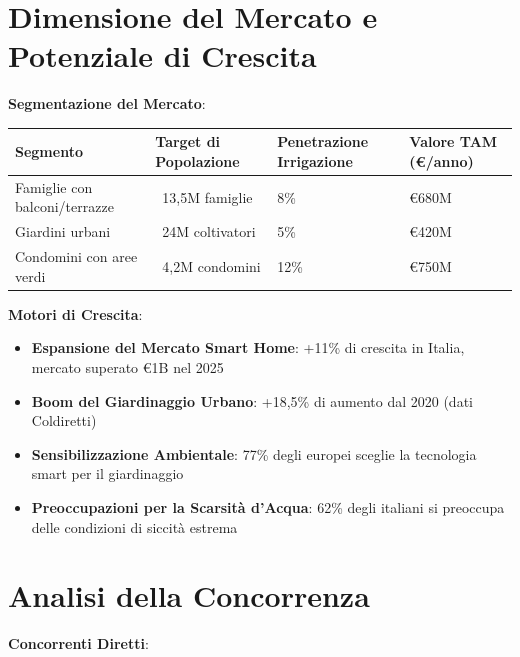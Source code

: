 \documentclass[11pt,a4paper]{report}
\begin{document}
\section{Dimensione del Mercato e Potenziale di Crescita}

\textbf{Segmentazione del Mercato}:

\begin{longtable}{|p{3cm}|p{3cm}|p{3cm}|p{2.5cm}|}
\hline
\textbf{Segmento} & \textbf{Target di Popolazione} & \textbf{Penetrazione Irrigazione} & \textbf{Valore TAM (€/anno)} \\ \hline
Famiglie con balconi/terrazze & ~13,5M famiglie & 8\% & €680M \\ \hline
Giardini urbani & ~24M coltivatori & 5\% & €420M \\ \hline
Condomini con aree verdi & ~4,2M condomini & 12\% & €750M \\ \hline
\end{longtable}

\textbf{Motori di Crescita}:
\begin{itemize}
    \item \textbf{Espansione del Mercato Smart Home}: +11\% di crescita in Italia, mercato superato €1B nel 2025
    \item \textbf{Boom del Giardinaggio Urbano}: +18,5\% di aumento dal 2020 (dati Coldiretti)
    \item \textbf{Sensibilizzazione Ambientale}: 77\% degli europei sceglie la tecnologia smart per il giardinaggio
    \item \textbf{Preoccupazioni per la Scarsità d'Acqua}: 62\% degli italiani si preoccupa delle condizioni di siccità estrema
\end{itemize}

\section{Analisi della Concorrenza}

\textbf{Concorrenti Diretti}:
\end{document}
